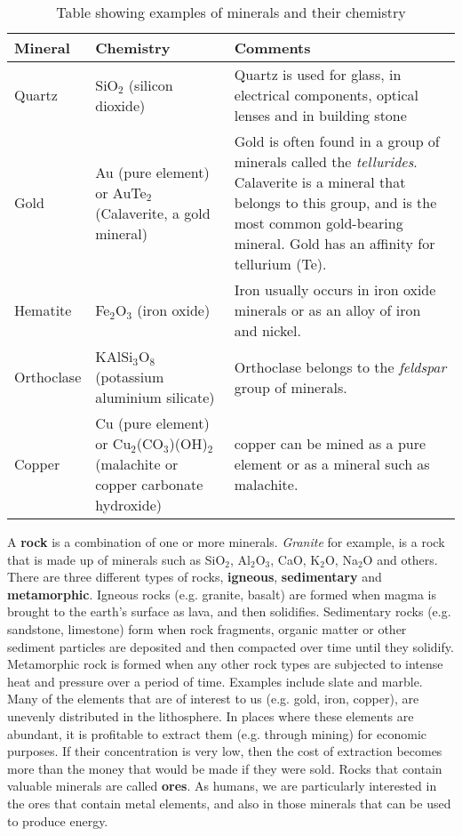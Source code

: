 \begin{table}[h]
\begin{center}
\caption{Table showing examples of minerals and their chemistry}
\label{tab:minerals}
\begin{tabular}{|l|p{4cm}|p{6cm}|}\hline
\textbf{Mineral} & \textbf{Chemistry} & \textbf{Comments}\\\hline
Quartz & SiO$_{2}$ (silicon dioxide) & Quartz is used for glass, in electrical components, optical lenses and in building stone \\\hline
Gold & Au (pure element) or AuTe$_{2}$ (Calaverite, a gold mineral) & Gold is often found in a group of minerals called the \textit{tellurides}. Calaverite is a mineral that belongs to this group, and is the most common gold-bearing mineral. Gold has an affinity for tellurium (Te). \\\hline
Hematite & Fe$_{2}$O$_{3}$ (iron oxide) & Iron usually occurs in iron oxide minerals or as an alloy of iron and nickel. \\\hline
Orthoclase & KAlSi$_{3}$O$_{8}$ (potassium aluminium silicate) & Orthoclase belongs to the \textit{feldspar} group of minerals. \\\hline
Copper & Cu (pure element) or Cu$_{2}$(CO$_{3}$)(OH)$_{2}$ (malachite or copper carbonate hydroxide) & copper can be mined as a pure element or as a mineral such as malachite. \\\hline
\end{tabular}
\end{center}
\end{table}

A \textbf{rock} is a combination of one or more minerals. \textit{Granite} for example, is a rock that is made up of minerals such as SiO$_{2}$, Al$_{2}$O$_{3}$, CaO, K$_{2}$O, Na$_{2}$O and others. There are three different types of rocks, \textbf{igneous}, \textbf{sedimentary} and \textbf{metamorphic}. Igneous rocks (e.g. granite, basalt) are formed when magma is brought to the earth's surface as lava, and then solidifies. Sedimentary rocks (e.g. sandstone, limestone) form when rock fragments, organic matter or other sediment particles are deposited and then compacted over time until they solidify. Metamorphic rock is formed when any other rock types are subjected to intense heat and pressure over a period of time. Examples include slate and marble.\\


Many of the elements that are of interest to us (e.g. gold, iron, copper), are unevenly distributed in the lithosphere. In places where these elements are abundant, it is profitable to extract them (e.g. through mining) for economic purposes. If their concentration is very low, then the cost of extraction becomes more than the money that would be made if they were sold. Rocks that contain valuable minerals are called \textbf{ores}. As humans, we are particularly interested in the ores that contain metal elements, and also in those minerals that can be used to produce energy.

